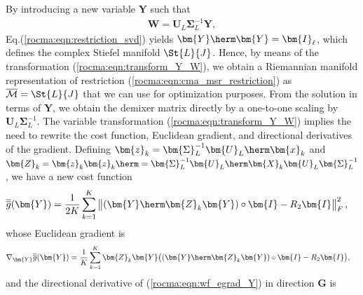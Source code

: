 By introducing a new variable $\bm{Y}$ such that %
\begin{align}
	\bm{W}=\bm{U}_L\bm{\Sigma}_L^{-1}\bm{Y},\label{rocma:eqn:transform_Y_W}
\end{align}
Eq.(\ref{rocma:eqn:restriction_svd}) yields $\bm{Y}\herm\bm{Y}=\bm{I}_{\ell}$, which defines the complex Stiefel manifold $\St{L}{J}$. 
Hence, by means of the transformation (\ref{rocma:eqn:transform_Y_W}), we obtain a Riemannian manifold representation of restriction (\ref{rocma:eqn:cma_msr_restriction}) as $\overline{\mathcal{M}}=\St{L}{J}$ that we can use for optimization purposes. 
From the solution in terms of $\bm{Y}$, we obtain the demixer matrix directly by a one-to-one scaling by $\bm{U}_L\bm{\Sigma}_L^{-1}$. The variable transformation (\ref{rocma:eqn:transform_Y_W})
implies the need to rewrite the cost function, Euclidean gradient, and directional derivatives of the gradient. 
Defining $\bm{z}_k=\bm{\Sigma}_L^{-1}\bm{U}_L\herm\bm{x}_k$ and $\bm{Z}_k=\bm{z}_k\bm{z}_k\herm=\bm{\Sigma}_L^{-1}\bm{U}_L\herm\bm{X}_k\bm{U}_L\bm{\Sigma}_L^{-1}$, we have a new cost function
\begin{align}
	\overline{\overline{g}}(\bm{Y})
	&=\frac{1}{2K}\sum_{k=1}^{K}\big\|(\bm{Y}\herm\bm{Z}_k\bm{Y})\circ\bm{I}-R_2\bm{I}\big\|_F^2
	\,,\label{rocma:eqn:wfcost_Y}	
\end{align}
whose Euclidean gradient is
\begin{align}	\nabla_{\bm{Y}}\overline{\overline{g}}(\bm{Y})&=
	\frac{1}{K}\sum_{k=1}^K\bm{Z}_k\bm{Y}\big((\bm{Y}\herm\bm{Z}_k\bm{Y})\circ\bm{I}-R_2\bm{I}\big), 
	\label{rocma:eqn:wf_egrad_Y}
\end{align} 
and the directional derivative of (\ref{rocma:eqn:wf_egrad_Y}) in direction $\bm{G}$ is
